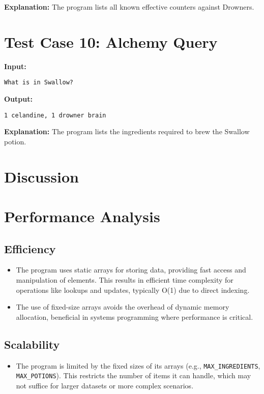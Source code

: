 \documentclass{article}
\begin{document}
\textbf{Explanation:} The program lists all known effective counters against Drowners.

\section*{Test Case 10: Alchemy Query}

\textbf{Input:}
\begin{lstlisting}
What is in Swallow?
\end{lstlisting}

\textbf{Output:}
\begin{lstlisting}
1 celandine, 1 drowner brain
\end{lstlisting}

\textbf{Explanation:} The program lists the ingredients required to brew the Swallow potion.

\section{Discussion}

\section*{Performance Analysis}

\subsection*{Efficiency}
\begin{itemize}
    \item The program uses static arrays for storing data, providing fast access and manipulation of elements. This results in efficient time complexity for operations like lookups and updates, typically O(1) due to direct indexing.
    \item The use of fixed-size arrays avoids the overhead of dynamic memory allocation, beneficial in systems programming where performance is critical.
\end{itemize}

\subsection*{Scalability}
\begin{itemize}
    \item The program is limited by the fixed sizes of its arrays (e.g., \texttt{MAX\_INGREDIENTS}, \texttt{MAX\_POTIONS}). This restricts the number of items it can handle, which may not suffice for larger datasets or more complex scenarios.
\end{itemize}
\end{document}
